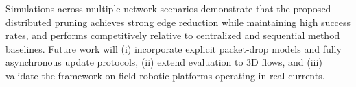 \documentclass[conference]{IEEEconf}
\theoremstyle{plain}
\begin{document}
Simulations across multiple network scenarios demonstrate that the proposed distributed pruning achieves strong edge reduction while maintaining high success rates, and performs competitively relative to centralized and sequential method baselines.
Future work will (i) incorporate explicit packet-drop models and fully asynchronous update protocols, (ii) extend evaluation to 3D flows, and (iii) validate the framework on field robotic platforms operating in real currents.



\end{document}
